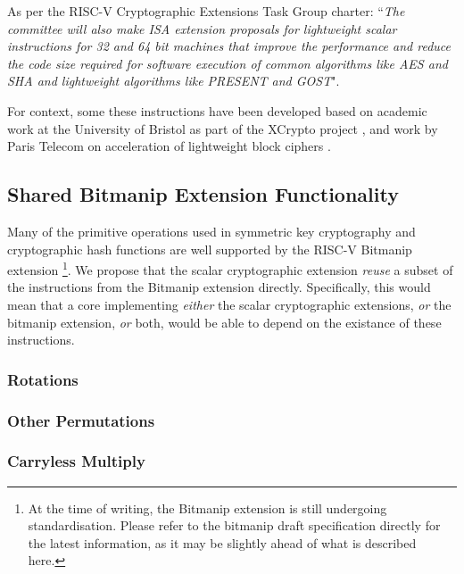 
As per the RISC-V Cryptographic Extensions Task Group charter:
``{\em The committee will also make ISA extension proposals for lightweight
scalar instructions for 32 and 64 bit machines that improve the performance
and reduce the code size required for software execution of common algorithms
like AES and SHA and lightweight algorithms like PRESENT and GOST}".

\bigskip

For context, some these instructions have been developed based on academic
work at the University of Bristol as part of the XCrypto project
\cite{MPP:19},
and work by
Paris Telecom on acceleration of lightweight block ciphers
\cite{TGMGD:19}.


\subsection{Shared Bitmanip Extension Functionality}

Many of the primitive operations used in symmetric key cryptography
and cryptographic hash functions are well supported by the
RISC-V Bitmanip \cite{riscv:bitmanip:repo} extension
\footnote{
At the time of writing, the Bitmanip extension is still undergoing
standardisation.
Please refer to the bitmanip draft specification
\cite{riscv:bitmanip:draft}
directly for the
latest information, as it may be slightly ahead of what is described
here.
}.
We propose that the scalar cryptographic extension {\em reuse} a
subset of the instructions from the Bitmanip extension directly.
Specifically, this would mean that
a core implementing
{\em either}
the scalar cryptographic extensions,
{\em or}
the bitmanip extension,
{\em or}
both,
would be able to depend on the existance of these instructions.

\subsubsection{Rotations}

\todo{}


\subsubsection{Other Permutations}

\todo{}


\subsubsection{Carryless Multiply}

